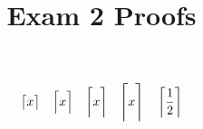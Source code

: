\documentclass{article}
\title{Exam 2 Proofs}
\author{}
\date{}
\begin{document}
	\[\ceil[\big]{x} \quad \ceil[\Big]{x} \quad \ceil[\bigg]{x} \quad \ceil[\Bigg]{x} \quad \ceil*[\big]{\frac{1}{2}}\]
\end{document}
